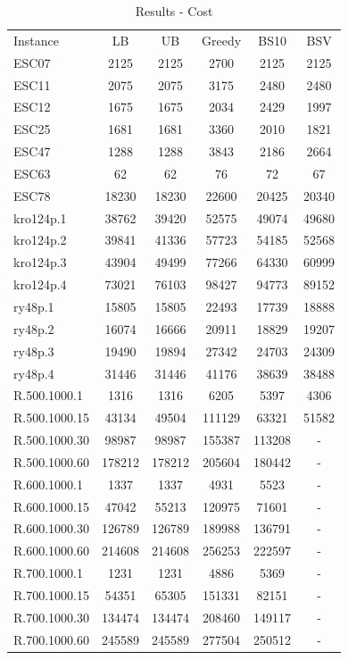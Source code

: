 \documentclass[]{article}
\begin{document}
    \begin{table}[htb]
		\begin{tabular}{lccccc}
			Instance & LB & UB & Greedy & BS10 & BSV\\
			ESC07 & 2125 & 2125 & 2700 & 2125 & 2125\\
			ESC11 & 2075 & 2075 & 3175 & 2480 & 2480\\
			ESC12 & 1675 & 1675 & 2034 & 2429 & 1997\\
			ESC25 & 1681 & 1681 & 3360 & 2010 & 1821\\
			ESC47 & 1288 & 1288 & 3843 & 2186 & 2664\\
			ESC63 & 62	  & 62    & 76 & 72 & 67\\
			ESC78 & 18230 & 18230 & 22600 & 20425 & 20340\\
			kro124p.1 & 38762 & 39420 & 52575 & 49074 & 49680\\
			kro124p.2 & 39841 & 41336 & 57723 & 54185 & 52568\\
			kro124p.3 & 43904 & 49499 & 77266 & 64330 & 60999\\
			kro124p.4 & 73021 & 76103 & 98427 & 94773 & 89152\\
			ry48p.1   & 15805 & 15805 & 22493 & 17739 & 18888\\
			ry48p.2   & 16074 & 16666 & 20911 & 18829 & 19207\\
			ry48p.3   & 19490 & 19894 & 27342 & 24703 & 24309\\
			ry48p.4   & 31446 & 31446 & 41176 & 38639 & 38488\\
			R.500.1000.1  & 1316   & 1316 & 6205 & 5397 & 4306\\
			R.500.1000.15 & 43134  & 49504 & 111129 & 63321 & 51582\\
			R.500.1000.30 & 98987  & 98987 & 155387 & 113208 & -\\
			R.500.1000.60 & 178212 & 178212 & 205604 & 180442 & -\\
			R.600.1000.1  & 1337   & 1337 & 4931 & 5523 & -\\
			R.600.1000.15 & 47042  & 55213 & 120975 & 71601 & -\\
			R.600.1000.30 & 126789 & 126789 & 189988 & 136791 & -\\
			R.600.1000.60 & 214608 & 214608 & 256253 & 222597 & -\\
			R.700.1000.1  & 1231   & 1231 & 4886 & 5369 & -\\
			R.700.1000.15 & 54351  & 65305 & 151331 & 82151 & -\\
			R.700.1000.30 & 134474 & 134474 & 208460 & 149117 & -\\
			R.700.1000.60 & 245589 & 245589 & 277504 & 250512 & -\\
		\end{tabular}
		\caption{Results - Cost}
		\label{table:results_cost}
	\end{table}
\end{document}
